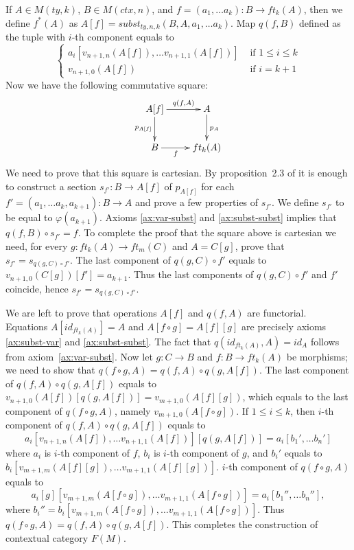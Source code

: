\documentclass[reqno]{amsart}
\theoremstyle{definition}
\theoremstyle{remark}
\numberwithin{figure}{section}
\begin{document}
If $A \in M(ty,k)$, $B \in M(ctx,n)$, and $f = (a_1, \ldots a_k) : B \to ft_k(A)$, then we define $f^*(A)$ as $A[f] = subst_{ty,n,k}(B, A, a_1, \ldots a_k)$.
Map $q(f,B)$ defined as the tuple with $i$-th component equals to
\[ \left\{
  \begin{array}{lr}
    a_i[v_{n+1,n}(A[f]), \ldots v_{n+1,1}(A[f])] & \text{ if } 1 \leq i \leq k \\
    v_{n+1,0}(A[f])                              & \text{ if } i = k+1
  \end{array}
\right. \]
Now we have the following commutative square:
\[ \xymatrix{ A[f] \ar[r]^-{q(f,A)} \ar[d]_{p_{A[f]}} & A \ar[d]^{p_A} \\
              B \ar[r]_-f                             & ft_k(A)
            } \]
We need to prove that this square is cartesian.
By proposition~2.3 of \cite{c-systems} it is enough to construct a section $s_{f'} : B \to A[f]$ of $p_{A[f]}$
    for each $f' = (a_1, \ldots a_k, a_{k+1}) : B \to A$ and prove a few properties of $s_{f'}$.
We define $s_{f'}$ to be equal to $\varphi(a_{k+1})$.
Axioms \eqref{ax:var-subst} and \eqref{ax:subst-subst} implies that $q(f,B) \circ s_{f'} = f$.
To complete the proof that the square above is cartesian we need, for every $g : ft_k(A) \to ft_m(C)$ and $A = C[g]$, prove that $s_{f'} = s_{q(g,C) \circ f'}$.
The last component of $q(g,C) \circ f'$ equals to $v_{n+1,0}(C[g])[f'] = a_{k+1}$.
Thus the last components of $q(g,C) \circ f'$ and $f'$ coincide, hence $s_{f'} = s_{q(g,C) \circ f'}$.

We are left to prove that operations $A[f]$ and $q(f,A)$ are functorial.
Equations $A[id_{ft_k(A)}] = A$ and $A[f \circ g] = A[f][g]$ are precisely axioms \eqref{ax:subst-var} and \eqref{ax:subst-subst}.
The fact that $q(id_{ft_k(A)}, A) = id_A$ follows from axiom~\ref{ax:var-subst}.
Now let $g : C \to B$ and $f : B \to ft_k(A)$ be morphisms; we need to show that $q(f \circ g, A) = q(f,A) \circ q(g,A[f])$.
The last component of $q(f,A) \circ q(g,A[f])$ equals to $v_{n+1,0}(A[f])[q(g,A[f])] = v_{m+1,0}(A[f][g])$,
    which equals to the last component of $q(f \circ g, A)$, namely $v_{m+1,0}(A[f \circ g])$.
If $1 \leq i \leq k$, then $i$-th component of $q(f,A) \circ q(g,A[f])$ equals to
\[ a_i[v_{n+1,n}(A[f]), \ldots v_{n+1,1}(A[f])][q(g,A[f])] = a_i[b_1', \ldots b_n'] \]
where $a_i$ is $i$-th component of $f$, $b_i$ is $i$-th component of $g$, and $b_i'$ equals to $b_i[v_{m+1,m}(A[f][g]), \ldots v_{m+1,1}(A[f][g])]$.
$i$-th component of $q(f \circ g, A)$ equals to
\[ a_i[g][v_{m+1,m}(A[f \circ g]), \ldots v_{m+1,1}(A[f \circ g])] = a_i[b_1'', \ldots b_n''], \]
where $b_i'' = b_i[v_{m+1,m}(A[f \circ g]), \ldots v_{m+1,1}(A[f \circ g])]$.
Thus $q(f \circ g, A) = q(f,A) \circ q(g,A[f])$.
This completes the construction of contextual category $F(M)$.
\end{document}
